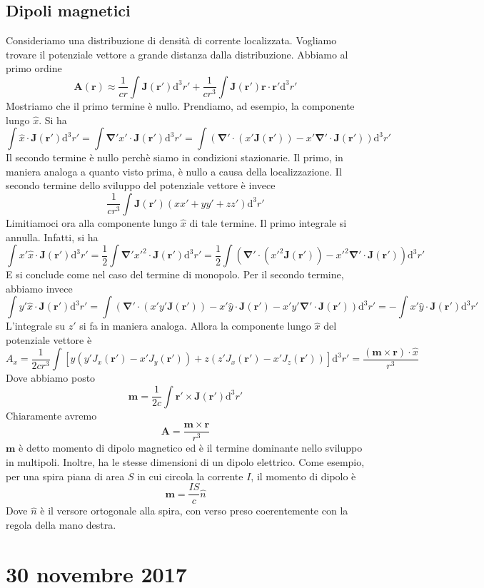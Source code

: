 \documentclass[a4paper,11pt]{book}
\newcommand{\dif}{\mathrm{d}}
\let\oldnabla\nabla
\renewcommand{\nabla}{\vec{\oldnabla}}
\renewcommand{\vec}[1]{\mathbf{#1}}
\theoremstyle{theorem}
\theoremstyle{definition}
\begin{document}
\subsection{Dipoli magnetici}
Consideriamo una distribuzione di densità di corrente localizzata. Vogliamo trovare il potenziale vettore a grande distanza dalla distribuzione. Abbiamo al primo ordine
\[\vec{A}(\vec{r})\approx\frac{1}{cr}\int\vec{J}(\vec{r}')\dif^3r'+\frac{1}{cr^3}\int\vec{J}(\vec{r}')\vec{r}\cdot\vec{r}'\dif^3r'\]
Mostriamo che il primo termine è nullo. Prendiamo, ad esempio, la componente lungo $\hat{x}$. Si ha
\[\int \hat{x}\cdot\vec{J}(\vec{r}')\dif^3r'=\int\nabla' x'\cdot\vec{J}(\vec{r}')\dif^3r'=\int\left(\nabla'\cdot(x'\vec{J}(\vec{r}'))-x'\nabla'\cdot\vec{J}(\vec{r}')\right)\dif^3r'\]
Il secondo termine è nullo perchè siamo in condizioni stazionarie. Il primo, in maniera analoga a quanto visto prima, è nullo a causa della localizzazione.
Il secondo termine dello sviluppo del potenziale vettore è invece
\[\frac{1}{cr^3}\int\vec{J}(\vec{r}')(xx'+yy'+zz')\dif^3r'\]
Limitiamoci ora alla componente lungo $\hat{x}$ di tale termine. Il primo integrale si annulla. Infatti, si ha
\[\int x'\hat{x}\cdot\vec{J}(\vec{r}')\dif^3r'=\frac{1}{2}\int\nabla' x'^2\cdot\vec{J}(\vec{r}')\dif^3r'=\frac{1}{2}\int\left(\nabla'\cdot(x'^2\vec{J}(\vec{r}'))-x'^2\nabla'\cdot\vec{J}(\vec{r}')\right)\dif^3r'\]
E si conclude come nel caso del termine di monopolo. Per il secondo termine, abbiamo invece
\[\int y'\hat{x}\cdot\vec{J}(\vec{r}')\dif^3r'=\int\left(\nabla'\cdot(x'y'\vec{J}(\vec{r}'))-x'\hat{y}\cdot\vec{J}(\vec{r}')-x'y'\nabla'\cdot\vec{J}(\vec{r}')\right)\dif^3r'=-\int x'\hat{y}\cdot\vec{J}(\vec{r}')\dif^3r'\]
L'integrale su $z'$ si fa in maniera analoga. Allora la componente lungo $\hat{x}$ del potenziale vettore è
\[A_x=\frac{1}{2cr^3}\int \left[y\left(y'J_x(\vec{r}')-x'J_y(\vec{r}')\right)+z\left(z'J_x(\vec{r}')-x'J_z(\vec{r}')\right)\right]\dif^3r'=\frac{(\vec{m}\times\vec{r})\cdot\hat{x}}{r^3}\]
Dove abbiamo posto
\[\vec{m}=\frac{1}{2c}\int\vec{r}'\times\vec{J}(\vec{r}')\dif^3r'\]
Chiaramente avremo
\[\vec{A}=\frac{\vec{m}\times\vec{r}}{r^3}\]
$\vec{m}$ è detto momento di dipolo magnetico ed è il termine dominante nello sviluppo in multipoli. Inoltre, ha le stesse dimensioni di un dipolo elettrico. Come esempio, per una spira piana di area $S$ in cui circola la corrente $I$, il momento di dipolo è
\[\vec{m}=\frac{IS}{c}\hat{n}\]
Dove $\hat{n}$ è il versore ortogonale alla spira, con verso preso coerentemente con la regola della mano destra.
\newpage
\section{30 novembre 2017}
\end{document}
